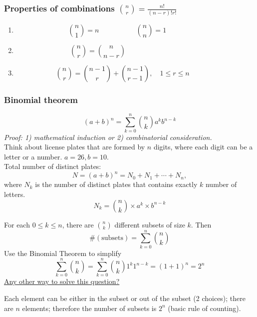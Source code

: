 \documentclass[slidestop,compress,mathserif]{beamer}
\begin{document}
\begin{frame}\frametitle{Properties of combinations ${n \choose r} = \frac{n!}{(n-r)!r!}$}

\begin{enumerate}
\item
\[{n \choose 1} = n ~~~~~~~~~~~~~~~~~~~~~~~~ {n \choose n} = 1~~~~~~~~~~~~ ~~~~~~~~~~~~\]
\pause
\item
\[{n \choose r} = {n \choose n - r} ~~~~~~~~~~~~~~~~~~~~~~~~~~~~~~~~~~~~~~~~~~~~~~~~~\]
\pause
\item
\[
{n \choose r} = {n-1 \choose r} + {n-1 \choose r-1}, \quad 1\leq r \leq n ~~~~~~~~~~~~~~~~~
\]
\end{enumerate}
\end{frame}

\begin{frame}\frametitle{Binomial theorem}

\[
(a + b)^n = \sum_{k = 0}^n {n \choose k} a^k b^{n-k}
\]
{\it Proof: 1) mathematical induction or 2) combinatorial consideration.}\\
\pause
Think about license plates that are formed by $n$ digits, where each digit can be a letter or a number.
$a = 26, b = 10$. \\
\pause
Total number of distinct plates:
\[
N = (a + b)^n = N_0 + N_1 + \cdots + N_n,
\]
where $N_k$ is the number of distinct plates that contains exactly $k$ number of letters.
\pause
\[
N_k = {n \choose k} \times a^k \times b^{n-k}
\]
\vfill
\end{frame}



\begin{frame}

\pause
For each $0 \leq k \leq n$, there are ${n \choose k}$ different subsets of size $k$. Then
\[
\#(\text{subsets}) = \sum_{k = 0}^n {n \choose k} %
\]
\pause
Use the Binomial Theorem to simplify
\[
\sum_{k = 0}^n {n \choose k} = \sum_{k = 0}^n {n \choose k} 1^k 1^{n-k} = (1 + 1)^n = 2^n
\]
\pause
\underline{Any other way to solve this question?}

\pause
Each element can be either in the subset or out of the subset (2 choices); there are $n$ elements; therefore the number of subsets is $2^n$ (basic rule of counting).
\end{frame}
\end{document}
